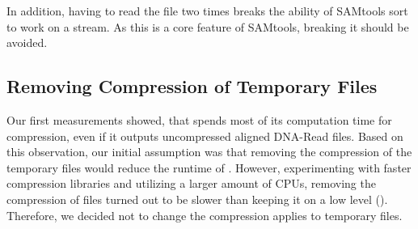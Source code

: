 In addition, having to read the file two times breaks the ability of SAMtools sort to work on a stream. As this is a core feature of SAMtools, breaking it should be avoided.

\subsection{Removing Compression of Temporary Files}
Our first measurements showed, that \sort spends most of its computation time for compression, even if it outputs uncompressed aligned DNA-Read files. Based on this observation, our initial assumption was that removing the compression of the temporary files would reduce the runtime of \sort. However, experimenting with faster compression libraries and utilizing a larger amount of CPUs, removing the compression of files turned out to be slower than keeping it on a low level (). Therefore, we decided not to change the compression \sort applies to temporary files. 